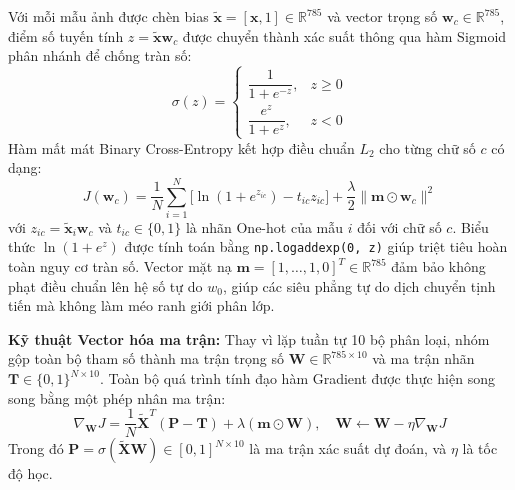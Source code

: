 \documentclass[11pt,a4paper]{article}
\begin{document}
Với mỗi mẫu ảnh được chèn bias $\tilde{\mathbf{x}} = [\mathbf{x}, 1] \in \mathbb{R}^{785}$ và vector trọng số $\mathbf{w}_c \in \mathbb{R}^{785}$, điểm số tuyến tính $z = \tilde{\mathbf{x}}\mathbf{w}_c$ được chuyển thành xác suất thông qua hàm Sigmoid phân nhánh để chống tràn số:
\begin{equation}
    \sigma(z) = \begin{cases} \dfrac{1}{1 + e^{-z}}, & z \ge 0 \\[6pt] \dfrac{e^z}{1 + e^z}, & z < 0 \end{cases}
\end{equation}
Hàm mất mát Binary Cross-Entropy kết hợp điều chuẩn $L_2$ cho từng chữ số $c$ có dạng:
\begin{equation}
    J(\mathbf{w}_c) = \frac{1}{N}\sum_{i=1}^N \Big[ \ln(1 + e^{z_{ic}}) - t_{ic}z_{ic} \Big] + \frac{\lambda}{2}\|\mathbf{m} \odot \mathbf{w}_c\|^2
\end{equation}
với $z_{ic} = \tilde{\mathbf{x}}_i \mathbf{w}_c$ và $t_{ic} \in \{0, 1\}$ là nhãn One-hot của mẫu $i$ đối với chữ số $c$. Biểu thức $\ln(1 + e^z)$ được tính toán bằng \texttt{np.logaddexp(0, z)} giúp triệt tiêu hoàn toàn nguy cơ tràn số. Vector mặt nạ $\mathbf{m} = [1, \dots, 1, 0]^T \in \mathbb{R}^{785}$ đảm bảo không phạt điều chuẩn lên hệ số tự do $w_0$, giúp các siêu phẳng tự do dịch chuyển tịnh tiến mà không làm méo ranh giới phân lớp.

\noindent
\textbf{Kỹ thuật Vector hóa ma trận:} Thay vì lặp tuần tự 10 bộ phân loại, nhóm gộp toàn bộ tham số thành ma trận trọng số $\mathbf{W} \in \mathbb{R}^{785 \times 10}$ và ma trận nhãn $\mathbf{T} \in \{0, 1\}^{N \times 10}$. Toàn bộ quá trình tính đạo hàm Gradient được thực hiện song song bằng một phép nhân ma trận:
\begin{equation}
    \nabla_{\mathbf{W}} J = \frac{1}{N}\tilde{\mathbf{X}}^T(\mathbf{P} - \mathbf{T}) + \lambda(\mathbf{m} \odot \mathbf{W}), \quad \mathbf{W} \leftarrow \mathbf{W} - \eta \nabla_{\mathbf{W}} J
\end{equation}
Trong đó $\mathbf{P} = \sigma(\tilde{\mathbf{X}}\mathbf{W}) \in [0, 1]^{N \times 10}$ là ma trận xác suất dự đoán, và $\eta$ là tốc độ học.
\end{document}
